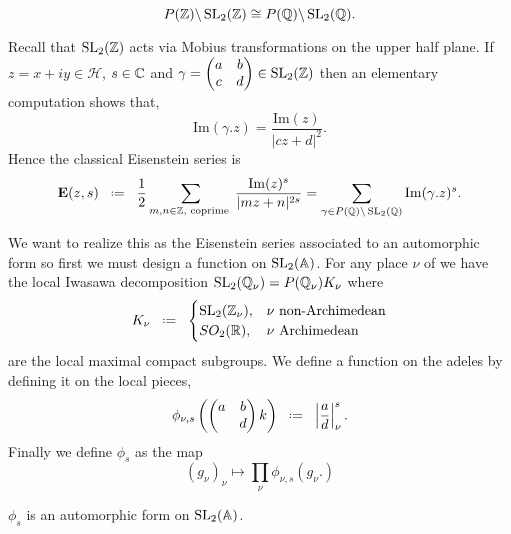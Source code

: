 \begin{Lemma}
	\[P(\Z) \backslash \SL_2(\Z) \cong P(\Q) \backslash \SL_2(\Q). \]
\end{Lemma}
Recall that \(\SL_2(\Z)\) acts via Mobius transformations on the upper half plane. If \(z= x+ iy \in \mathcal{H}\), \(s\in \C\) and \(\gamma = \begin{pmatrix}
	a & b\\ c& d \end{pmatrix}\in \SL_2(\Z)\) then an elementary computation shows that,
\[\mathrm{Im}(\gamma.z) = \frac{\mathrm{Im}(z)}{|cz + d|^{2}}.\]
Hence the classical Eisenstein series is 
\[\mathbf{E}(z, s) \defeq \frac{1}{2} \sum_{m,n\in \Z, \text{ coprime }} \frac{\mathrm{Im}(z)^{s}}{|mz+n|^{2s}} = \sum_{\gamma\in P(\Q)\backslash \SL_2(\Q)} \mathrm{Im}(\gamma.z)^{s}.\]

We want to realize this as the Eisenstein series associated to an automorphic form so first we must design a function on \(\SL_2(\A)\). For any place \(\nu\) of \Q we have the local Iwasawa decomposition \(\SL_2(\Q_\nu) = P(\Q_\nu) K_\nu\) where 
\[K_\nu \defeq \begin{cases}
	\SL_2(\Z_\nu), & \nu \text{ non-Archimedean}\\
	SO_2(\R), & \nu \text{ Archimedean}
\end{cases}\]
 are the local maximal compact subgroups. We define a function on the adeles by defining it on the local pieces,
 \[\phi_{\nu, s}\left(\begin{pmatrix}
 	a & b\\ & d
 \end{pmatrix}k\right) \defeq \left| \frac{a}{d} \right|_\nu^s .\]
 Finally we define \(\phi_s\) as the map 
 \[(g_\nu)_{\nu} \mapsto \prod_\nu \phi_{\nu,s}(g_\nu.)\]
 
 \begin{Lemma}
 	\(\phi_s\) is an automorphic form on \(\SL_2(\A)\).
 \end{Lemma}
 
